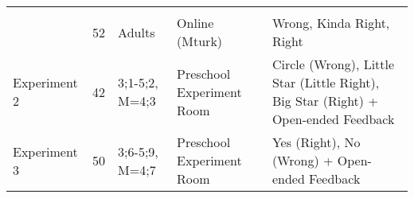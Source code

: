 \documentclass[,man,floatsintext]{apa6}
\begin{document}
\begin{longtable}[]{@{}lllll@{}}
\begin{minipage}[t]{0.34\columnwidth}
\end{minipage}\tabularnewline
\begin{minipage}[t]{0.16\columnwidth}\raggedright
\strut
\end{minipage} & \begin{minipage}[t]{0.01\columnwidth}\raggedright
52\strut
\end{minipage} & \begin{minipage}[t]{0.17\columnwidth}\raggedright
Adults\strut
\end{minipage} & \begin{minipage}[t]{0.17\columnwidth}\raggedright
Online (Mturk)\strut
\end{minipage} & \begin{minipage}[t]{0.34\columnwidth}\raggedright
Wrong, Kinda Right, Right\strut
\end{minipage}\tabularnewline
\begin{minipage}[t]{0.16\columnwidth}\raggedright
Experiment 2\strut
\end{minipage} & \begin{minipage}[t]{0.01\columnwidth}\raggedright
42\strut
\end{minipage} & \begin{minipage}[t]{0.17\columnwidth}\raggedright
3;1-5;2, M=4;3\strut
\end{minipage} & \begin{minipage}[t]{0.17\columnwidth}\raggedright
Preschool Experiment Room\strut
\end{minipage} & \begin{minipage}[t]{0.34\columnwidth}\raggedright
Circle (Wrong), Little Star (Little Right), Big Star (Right) + Open-ended Feedback\strut
\end{minipage}\tabularnewline
\begin{minipage}[t]{0.16\columnwidth}\raggedright
Experiment 3\strut
\end{minipage} & \begin{minipage}[t]{0.01\columnwidth}\raggedright
50\strut
\end{minipage} & \begin{minipage}[t]{0.17\columnwidth}\raggedright
3;6-5;9, M=4;7\strut
\end{minipage} & \begin{minipage}[t]{0.17\columnwidth}\raggedright
Preschool Experiment Room\strut
\end{minipage} & \begin{minipage}[t]{0.34\columnwidth}\raggedright
Yes (Right), No (Wrong) + Open-ended Feedback\strut
\end{minipage}\tabularnewline
\bottomrule
\end{longtable}
\end{document}
